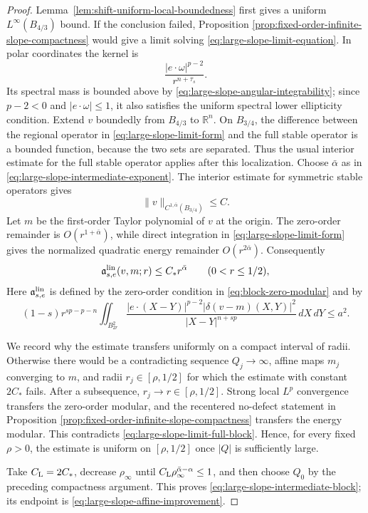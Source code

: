 \documentclass[11pt,reqno]{amsart}
\numberwithin{equation}{section}
\newcommand{\R}{\mathbb R}
\newcommand{\dd}{\,d}
\theoremstyle{remark}
\begin{document}
\begin{proof}
Lemma~\ref{lem:shift-uniform-local-boundedness} first gives a uniform
\(L^\infty(B_{4/3})\) bound.  If the conclusion failed, Proposition
\ref{prop:fixed-order-infinite-slope-compactness} would give a limit
solving \eqref{eq:large-slope-limit-equation}.  In polar coordinates the
kernel is
\[
 \frac{|e\cdot\omega|^{p-2}}{r^{n+\tau_s}}.
\]
Its spectral mass is bounded above by
\eqref{eq:large-slope-angular-integrability}; since \(p-2<0\) and
\(|e\cdot\omega|\le1\), it also satisfies the uniform spectral lower
ellipticity condition.  Extend \(v\) boundedly from \(B_{4/3}\) to
\(\R^n\).  On \(B_{3/4}\), the difference between the regional operator
in \eqref{eq:large-slope-limit-form} and the full stable operator is a
bounded function, because the two sets are separated.  Thus the usual
interior estimate for the full stable operator applies after this
localization.  Choose \(\bar\alpha\) as in
\eqref{eq:large-slope-intermediate-exponent}.  The interior estimate for
symmetric stable operators \cite{RosOtonSerraStable} gives
\[
 \|v\|_{C^{1,\bar\alpha}(B_{3/4})}\le C.
\]
Let \(m\) be the first-order Taylor polynomial of \(v\) at the origin.
The zero-order remainder is \(O(r^{1+\bar\alpha})\), while direct
integration in \eqref{eq:large-slope-limit-form} gives the normalized
quadratic energy remainder \(O(r^{2\bar\alpha})\).  Consequently
\begin{equation}
 \mathfrak a_{s,e}^{\rm lin}(v,m;r)
 \le C_*r^{\bar\alpha}
 \qquad(0<r\le1/2),
 \label{eq:large-slope-limit-full-block}
\end{equation}
Here \(\mathfrak a_{s,e}^{\rm lin}\) is defined by the zero-order
condition in \eqref{eq:block-zero-modular} and by
\[
 (1-s)r^{sp-p-n}
 \iint_{B_{2r}^2}
 \frac{|e\cdot(X-Y)|^{p-2}
       |\delta(v-m)(X,Y)|^2}
 {|X-Y|^{n+sp}}\dd X\!\dd Y\le a^2.
\]

We record why the estimate transfers uniformly on a compact interval of
radii.  Otherwise there would be a contradicting sequence
\(Q_j\to\infty\), affine maps \(m_j\) converging to \(m\), and radii
\(r_j\in[\rho,1/2]\) for which the estimate with constant \(2C_*\)
fails.  After a subsequence, \(r_j\to r\in[\rho,1/2]\).  Strong local
\(L^p\) convergence transfers the zero-order modular, and the recentered
no-defect statement in Proposition
\ref{prop:fixed-order-infinite-slope-compactness} transfers the energy
modular.  This contradicts \eqref{eq:large-slope-limit-full-block}.
Hence, for every fixed \(\rho>0\), the estimate is uniform on
\([\rho,1/2]\) once \(|Q|\) is sufficiently large.

Take \(C_{\rm L}=2C_*\), decrease \(\rho_\infty\) until
\(C_{\rm L}\rho_\infty^{\bar\alpha-\alpha}\le1\), and then choose
\(Q_0\) by the preceding compactness argument.  This proves
\eqref{eq:large-slope-intermediate-block}; its endpoint is
\eqref{eq:large-slope-affine-improvement}.
\end{proof}
\end{document}
